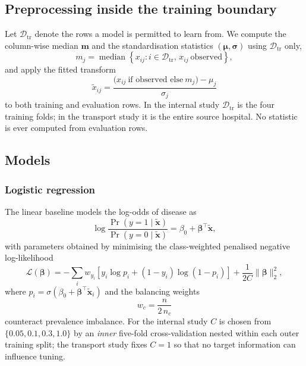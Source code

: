 \documentclass[manuscript,nonacm]{acmart}
\begin{document}
\subsection{Preprocessing inside the training boundary}
Let $\mathcal{D}_{\text{tr}}$ denote the rows a model is permitted to learn from. We
compute the column-wise median $\mathbf{m}$ and the standardisation statistics
$(\boldsymbol{\mu},\boldsymbol{\sigma})$ using $\mathcal{D}_{\text{tr}}$ only,
\begin{equation}
m_j=\operatorname{median}\!\left\{x_{ij} : i \in \mathcal{D}_{\text{tr}},\, x_{ij}\ \text{observed}\right\},
\end{equation}
and apply the fitted transform
\begin{equation}
\tilde{x}_{ij}=\frac{\big(x_{ij}\ \text{if observed else}\ m_j\big)-\mu_j}{\sigma_j}
\label{eq:preproc}
\end{equation}
to both training and evaluation rows. In the internal study $\mathcal{D}_{\text{tr}}$
is the four training folds; in the transport study it is the entire source hospital.
No statistic is ever computed from evaluation rows.

\subsection{Models}
\subsubsection{Logistic regression}
The linear baseline models the log-odds of disease as
\begin{equation}
\log\frac{\Pr(y=1\mid \tilde{\mathbf{x}})}{\Pr(y=0\mid \tilde{\mathbf{x}})}
   = \beta_0 + \boldsymbol{\beta}^{\!\top}\tilde{\mathbf{x}},
\end{equation}
with parameters obtained by minimising the class-weighted penalised negative
log-likelihood
\begin{equation}
\mathcal{L}(\boldsymbol{\beta})=
-\sum_{i}w_{y_i}\!\left[y_i\log p_i+(1-y_i)\log(1-p_i)\right]
+\frac{1}{2C}\lVert\boldsymbol{\beta}\rVert_2^2 ,
\label{eq:logreg}
\end{equation}
where $p_i=\sigma(\beta_0+\boldsymbol{\beta}^{\!\top}\tilde{\mathbf{x}}_i)$ and
the balancing weights
\begin{equation}
w_c=\frac{n}{2\,n_c}
\label{eq:weights}
\end{equation}
counteract prevalence imbalance. For the internal study $C$ is chosen from
$\{0.05,0.1,0.3,1.0\}$ by an \emph{inner} five-fold cross-validation nested within each
outer training split; the transport study fixes $C=1$ so that no target information can
influence tuning.
\end{document}
